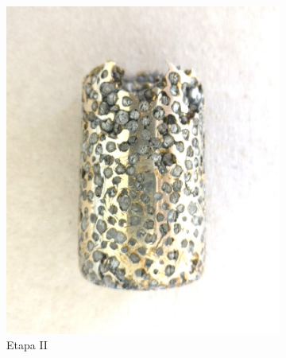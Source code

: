 \documentclass[a4paper,12pt,fleqn,twoside,openany]{book}
\begin{document}
\begin{figure}
\begin{subfigure}{0.35\textwidth}
        \includegraphics[width=\textwidth]{Img/Procedimiento/proceso2.jpg}
        \caption{Etapa II}
        \label{fig:proceso2}
    \end{subfigure}
    \begin{subfigure}{0.28\textwidth}

\end{subfigure}
\end{figure}
\end{document}
